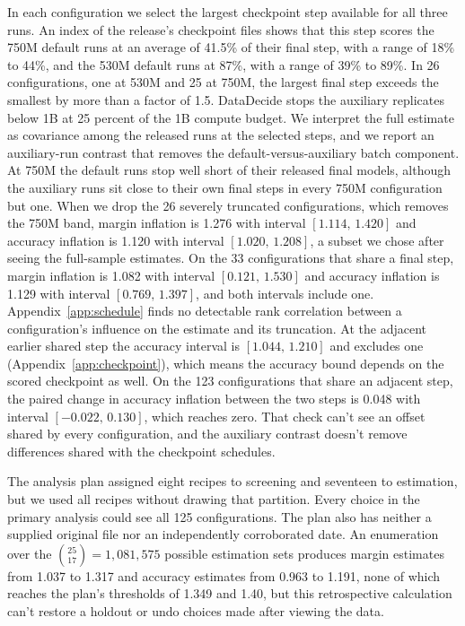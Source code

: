 \documentclass{article}
\newcommand{\ci}[2]{\ensuremath{[#1,\,#2]}}
\begin{document}
In each configuration we select the largest checkpoint step available for all three runs. An index of the release's checkpoint files shows that this step scores the 750M default runs at an average of 41.5\% of their final step, with a range of 18\% to 44\%, and the 530M default runs at 87\%, with a range of 39\% to 89\%. In 26 configurations, one at 530M and 25 at 750M, the largest final step exceeds the smallest by more than a factor of 1.5. DataDecide stops the auxiliary replicates below 1B at 25 percent of the 1B compute budget. We interpret the full estimate as covariance among the released runs at the selected steps, and we report an auxiliary-run contrast that removes the default-versus-auxiliary batch component. At 750M the default runs stop well short of their released final models, although the auxiliary runs sit close to their own final steps in every 750M configuration but one. When we drop the 26 severely truncated configurations, which removes the 750M band, margin inflation is 1.276 with interval \ci{1.114}{1.420} and accuracy inflation is 1.120 with interval \ci{1.020}{1.208}, a subset we chose after seeing the full-sample estimates. On the 33 configurations that share a final step, margin inflation is 1.082 with interval \ci{0.121}{1.530} and accuracy inflation is 1.129 with interval \ci{0.769}{1.397}, and both intervals include one. Appendix~\ref{app:schedule} finds no detectable rank correlation between a configuration's influence on the estimate and its truncation. At the adjacent earlier shared step the accuracy interval is \ci{1.044}{1.210} and excludes one (Appendix~\ref{app:checkpoint}), which means the accuracy bound depends on the scored checkpoint as well. On the 123 configurations that share an adjacent step, the paired change in accuracy inflation between the two steps is 0.048 with interval \ci{-0.022}{0.130}, which reaches zero. That check can't see an offset shared by every configuration, and the auxiliary contrast doesn't remove differences shared with the checkpoint schedules.

The analysis plan assigned eight recipes to screening and seventeen to estimation, but we used all recipes without drawing that partition. Every choice in the primary analysis could see all 125 configurations. The plan also has neither a supplied original file nor an independently corroborated date. An enumeration over the $\binom{25}{17}=1{,}081{,}575$ possible estimation sets produces margin estimates from 1.037 to 1.317 and accuracy estimates from 0.963 to 1.191, none of which reaches the plan's thresholds of 1.349 and 1.40, but this retrospective calculation can't restore a holdout or undo choices made after viewing the data.
\end{document}
